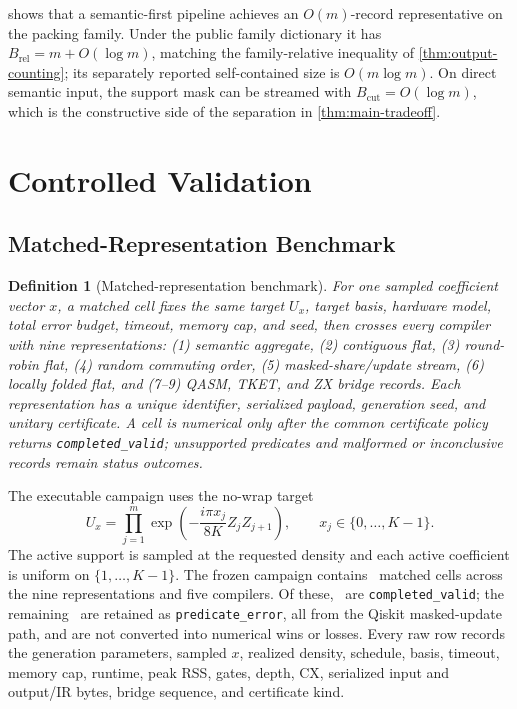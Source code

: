 \documentclass[aps,prx,reprint,floatfix,superscriptaddress]{revtex4-2}
\newtheorem{definition}{Definition}
\begin{document}
 shows that a semantic-first pipeline
achieves an $O(m)$-record representative on the packing family.  Under the
public family dictionary it has
$B_{\mathrm{rel}}=m+O(\log m)$, matching the
family-relative inequality of \cref{thm:output-counting}; its separately
reported self-contained size is $O(m\log m)$.  On direct semantic input,
the support mask can be streamed with $B_{\mathrm{cut}}=O(\log m)$, which
is the constructive side of the separation in
\cref{thm:main-tradeoff}.


\section{Controlled Validation}
\label{sec:validation}

\subsection{Matched-Representation Benchmark}

\begin{definition}[Matched-representation benchmark]
\label{def:matched-benchmark}
For one sampled coefficient vector $x$, a matched cell fixes the same target
$U_x$, target basis, hardware model, total error budget, timeout, memory cap,
and seed, then crosses every compiler with nine representations:
(1) semantic aggregate, (2) contiguous flat, (3) round-robin flat,
(4) random commuting order, (5) masked-share/update stream, (6) locally
folded flat, and (7--9) QASM, TKET, and ZX bridge records.  Each representation
has a unique identifier, serialized payload, generation seed, and unitary
certificate.  A cell is numerical only after the common certificate policy
returns \texttt{completed\_valid}; unsupported predicates and malformed or
inconclusive records remain status outcomes.
\end{definition}

The executable campaign uses the no-wrap target
\begin{equation*}
 U_x=\prod_{j=1}^{m}\exp\!\left(-\frac{i\pi x_j}{8K}Z_jZ_{j+1}\right),
 \qquad x_j\in\{0,\ldots,K-1\}.
\end{equation*}
The active support is sampled at the requested density and each active
coefficient is uniform on $\{1,\ldots,K-1\}$.  The frozen campaign contains
\MatchedCells\ matched cells across the nine representations and five
compilers.  Of these, \MatchedCompleted\ are
\texttt{completed\_valid}; the remaining \MatchedPredicateErrors\ are retained
as \texttt{predicate\_error}, all from the Qiskit masked-update path, and are
not converted into numerical wins or losses.  Every raw row records the
generation parameters, sampled $x$, realized density, schedule, basis,
timeout, memory cap, runtime, peak RSS, gates, depth, CX, serialized input and
output/IR bytes, bridge sequence, and certificate kind.
\end{document}
